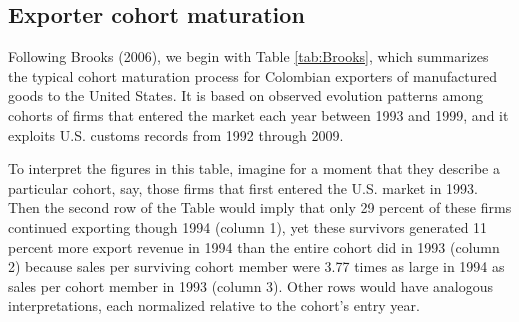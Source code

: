 \documentclass[12pt]{article}
\begin{document}
\subsection{Exporter cohort maturation}

Following Brooks (2006), we begin with Table \ref{tab:Brooks}, which
summarizes the typical cohort maturation process for Colombian exporters of
manufactured goods to the United States. It is based on observed evolution
patterns among cohorts of firms that entered the market each year between
1993 and 1999, and it exploits U.S. customs records from 1992 through 2009.

To interpret the figures in this table, imagine for a moment that they
describe a particular cohort, say, those firms that first entered the U.S.
market in 1993. Then the second row of the Table would imply that only 29
percent of these firms continued exporting though 1994 (column 1), yet these
survivors generated 11 percent more export revenue in 1994 than the entire
cohort did in 1993 (column 2) because sales per surviving cohort member were
3.77 times as large in 1994 as sales per cohort member in 1993 (column 3).
Other rows would have analogous interpretations, each normalized relative to
the cohort's entry year.
\end{document}
